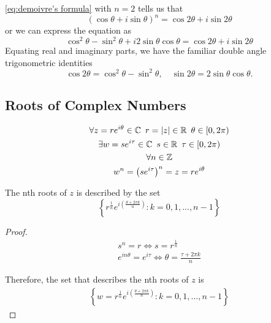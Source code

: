 \documentclass[notoc,notitlepage]{tufte-book}
\begin{document}
\begin{eg}
	\cref{eq:demoivre's formula} with $n = 2$ tells us that
	\begin{equation*}
		(\cos \theta + i \sin \theta)^n = \cos 2\theta + i \sin 2\theta
	\end{equation*}
	or we can express the equation as
	\begin{equation*}
		\cos^2 \theta - \sin^2 \theta + i2 \sin\theta \cos\theta = \cos 2\theta + i \sin 2\theta
	\end{equation*}
	Equating real and imaginary parts, we have the familiar double angle trigonometric identities
	\begin{equation*}
		\cos 2\theta = \cos^2 \theta - \sin^2 \theta, \quad \sin 2\theta = 2\sin\theta\cos\theta.
	\end{equation*}
\end{eg}

\subsection{Roots of Complex Numbers} %
\label{sub:roots_of_complex_numbers}

\begin{propo}\label{propo:nth Roots of a Complex Number}
	\begin{gather*}
		\forall z = re^{i\theta} \in \mathbb{C} \enspace r = \left|z\right| \in \mathbb{R} \enspace \theta \in [0, 2\pi) \\
		\exists w = se^{i\tau} \in \mathbb{C} \enspace s \in \mathbb{R} \enspace \tau \in [0, 2\pi) \\
		\forall n \in \mathbb{Z} \\ 
		w^n = \left( se^{i\tau}\right)^n = z = re^{i\theta}
	\end{gather*}

	The nth roots of $z$ is described by the set
	\begin{equation}\label{eq:nth roots of a complex number}
		\left\{ r^{\frac{1}{n}} e^{i \left(\frac{\theta + 2 \pi k}{n} \right)} : k = 0, 1, ..., n - 1 \right\}
	\end{equation}

	\begin{proof}
		\begin{gather*}
			s^n = r \iff s = r^{\frac{1}{n}} \\
			e^{in\theta} = e^{i \tau} \iff \theta = \frac{\tau + 2 \pi k}{n}
		\end{gather*}

		Therefore, the set that describes the nth roots of $z$ is
		\begin{gather*}
			\left\{ w = r^\frac{1}{n} e^{i \left( \frac{\theta + 2 \pi k}{n} \right)} : k = 0, 1, ..., n - 1 \right\}
		\end{gather*}
	\end{proof}
\end{propo}
\end{document}
